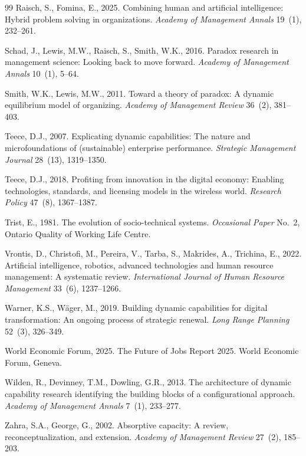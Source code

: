 \documentclass[12pt, a4paper]{article}
\begin{document}
\begin{thebibliography}{99}
Raisch, S., Fomina, E., 2025. Combining human and artificial intelligence: Hybrid problem solving in organizations. \textit{Academy of Management Annals} 19~(1), 232--261.

Schad, J., Lewis, M.W., Raisch, S., Smith, W.K., 2016. Paradox research in management science: Looking back to move forward. \textit{Academy of Management Annals} 10~(1), 5--64.

Smith, W.K., Lewis, M.W., 2011. Toward a theory of paradox: A dynamic equilibrium model of organizing. \textit{Academy of Management Review} 36~(2), 381--403.

Teece, D.J., 2007. Explicating dynamic capabilities: The nature and microfoundations of (sustainable) enterprise performance. \textit{Strategic Management Journal} 28~(13), 1319--1350.

Teece, D.J., 2018. Profiting from innovation in the digital economy: Enabling technologies, standards, and licensing models in the wireless world. \textit{Research Policy} 47~(8), 1367--1387.

Trist, E., 1981. The evolution of socio-technical systems. \textit{Occasional Paper} No.~2, Ontario Quality of Working Life Centre.

Vrontis, D., Christofi, M., Pereira, V., Tarba, S., Makrides, A., Trichina, E., 2022. Artificial intelligence, robotics, advanced technologies and human resource management: A systematic review. \textit{International Journal of Human Resource Management} 33~(6), 1237--1266.

Warner, K.S., W\"{a}ger, M., 2019. Building dynamic capabilities for digital transformation: An ongoing process of strategic renewal. \textit{Long Range Planning} 52~(3), 326--349.

World Economic Forum, 2025. The Future of Jobs Report 2025. World Economic Forum, Geneva.

Wilden, R., Devinney, T.M., Dowling, G.R., 2013. The architecture of dynamic capability research identifying the building blocks of a configurational approach. \textit{Academy of Management Annals} 7~(1), 233--277.

Zahra, S.A., George, G., 2002. Absorptive capacity: A review, reconceptualization, and extension. \textit{Academy of Management Review} 27~(2), 185--203.


\end{thebibliography}
\end{document}
